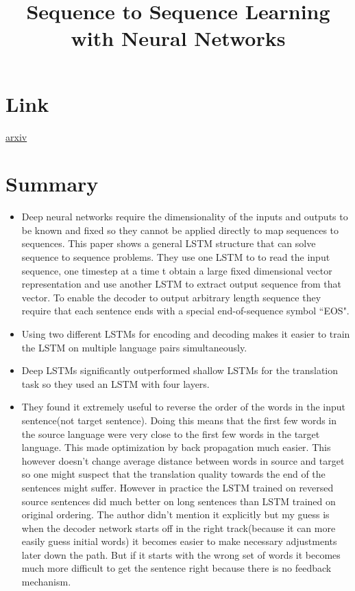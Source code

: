 \documentclass{article}
\title{Sequence to Sequence Learning with Neural Networks}
\author{}
\date{}
\begin{document}
\maketitle

\section*{Link}
\href{https://arxiv.org/abs/1409.3215}{arxiv} 

\section*{Summary}
\begin{itemize}
    \item Deep neural networks require the dimensionality of the inputs and outputs to be known and fixed so they cannot be applied directly to map sequences to sequences. This paper shows a general LSTM structure that can solve sequence to sequence problems. They use one LSTM to to read the input sequence, one timestep at a time t obtain a large fixed dimensional vector representation and use another LSTM to extract output sequence from that vector. To enable the decoder to output arbitrary length sequence they require that each sentence ends with a special end-of-sequence symbol ``EOS".
    \item Using two different LSTMs for encoding and decoding makes it easier to train the LSTM on multiple language pairs simultaneously.
    \item Deep LSTMs significantly outperformed shallow LSTMs for the translation task so they used an LSTM with four layers.
    \item They found it extremely useful to reverse the order of the words in the input sentence(not target sentence). Doing this means that the first few words in the source language were very close to the first few words in the target language. This made optimization by back propagation much easier. This however doesn't change average distance between words in source and target so one might suspect that the translation quality towards the end of the sentences might suffer. However in practice the LSTM trained on reversed source sentences did much better on long sentences than LSTM trained on original ordering. The author didn't mention it explicitly but my guess is when the decoder network starts off in the right track(because it can more easily guess initial words) it becomes easier to make necessary adjustments later down the path. But if it starts with the wrong set of words it becomes much more difficult to get the sentence right because there is no feedback mechanism.

\end{itemize}
\end{document}
